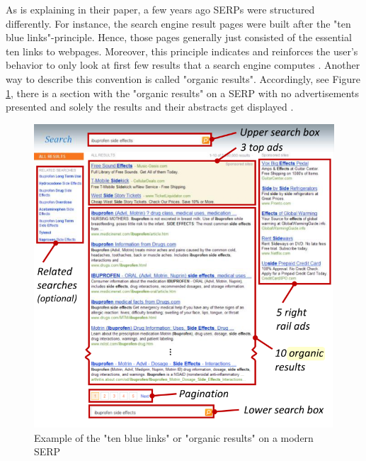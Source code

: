 As \textcite{lewandowski2015evaluating} is explaining in their paper, a few years ago SERPs were structured differently. For instance, the search engine result pages were built after the "ten blue links"-principle. Hence, those pages generally just consisted of the essential ten links to webpages. Moreover, this principle indicates and reinforces the user's behavior to only look at first few results that a search engine computes \autocite{lewandowski2015evaluating, liu2015influence, wang2016beyond}. Another way to describe this convention is called "organic results". Accordingly, see Figure \ref{figure:OrganicResults}, there is a section with the "organic results" on a SERP with no advertisements presented and solely the results and their abstracts get displayed \autocite{buscher2010good}.

\begin{figure}[!ht]
    \centering
    \includegraphics[width=1 \linewidth]{images/organic_buscher2010good.png}
    \caption{
        Example of the "ten blue links" or "organic results" on a modern SERP \autocite[3]{buscher2010good}
    }
    \label{figure:OrganicResults}
\end{figure}

